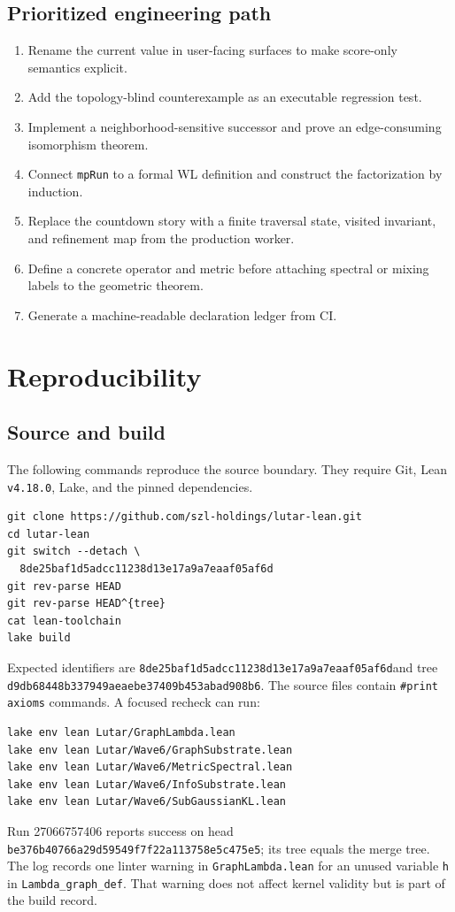 \documentclass[10pt,letterpaper]{article}
\theoremstyle{definition}
\newcommand{\sha}[2]{\texttt{#1}\allowbreak\texttt{#2}}
\newcommand{\commit}{\sha{8de25baf1d5adcc11238}{d13e17a9a7eaaf05af6d}}
\begin{document}
\subsection{Prioritized engineering path}
\begin{enumerate}
\item Rename the current value in user-facing surfaces to make score-only
  semantics explicit.
\item Add the topology-blind counterexample as an executable regression test.
\item Implement a neighborhood-sensitive successor and prove an
  edge-consuming isomorphism theorem.
\item Connect \texttt{mpRun} to a formal WL definition and construct the
  factorization by induction.
\item Replace the countdown story with a finite traversal state, visited
  invariant, and refinement map from the production worker.
\item Define a concrete operator and metric before attaching spectral or
  mixing labels to the geometric theorem.
\item Generate a machine-readable declaration ledger from CI.
\end{enumerate}

\section{Reproducibility}\label{sec:repro}
\subsection{Source and build}
The following commands reproduce the source boundary. They require Git,
Lean \texttt{v4.18.0}, Lake, and the pinned dependencies.
\begin{lstlisting}[language={},caption={Reproduce the frozen source and build.}]
git clone https://github.com/szl-holdings/lutar-lean.git
cd lutar-lean
git switch --detach \
  8de25baf1d5adcc11238d13e17a9a7eaaf05af6d
git rev-parse HEAD
git rev-parse HEAD^{tree}
cat lean-toolchain
lake build
\end{lstlisting}
Expected identifiers are \commit and tree
\sha{d9db68448b337949aeae}{be37409b453abad908b6}. The source files contain
\texttt{\#print axioms} commands. A focused recheck can run:
\begin{lstlisting}[language={},caption={Focused module checks.}]
lake env lean Lutar/GraphLambda.lean
lake env lean Lutar/Wave6/GraphSubstrate.lean
lake env lean Lutar/Wave6/MetricSpectral.lean
lake env lean Lutar/Wave6/InfoSubstrate.lean
lake env lean Lutar/Wave6/SubGaussianKL.lean
\end{lstlisting}
Run 27066757406 reports success on head
\texttt{be376b40766a29d59549f7f22a113758e5c475e5}; its tree equals the merge
tree. The log records one linter warning in \texttt{GraphLambda.lean} for an
unused variable \texttt{h} in \texttt{Lambda\_graph\_def}. That warning does
not affect kernel validity but is part of the build record.
\end{document}
